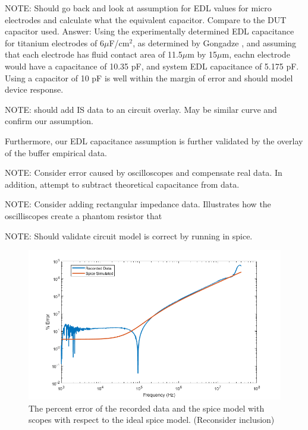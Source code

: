 \par NOTE: Should go back and look at assumption for EDL values for micro electrodes and calculate what the equivalent capacitor. Compare to the DUT capacitor used. Answer: Using the experimentally determined EDL capacitance for titanium electrodes of 6$\mu$F/cm$^2$, as determined by Gongadze \cite{_gongadze.pdf_????}, and assuming that each electrode has fluid contact area of 11.5$\mu$m by 15$\mu$m, eachn electrode would have a capacitance of 10.35 pF, and system EDL capacitance of 5.175 pF. Using a capacitor of 10 pF is well within the margin of error and should model device response. 

\par NOTE: should add IS data to an circuit overlay. May be similar curve and confirm our assumption.

\par Furthermore, our EDL capacitance assumption is further validated by the overlay of the buffer empirical data.

\par NOTE: Consider error caused by oscilloscopes and compensate real data. In addition, attempt to subtract theoretical capacitance from data.

\par NOTE: Consider adding rectangular impedance data. Illustrates how the oscilliscopes create a phantom resistor that 

\par NOTE: Should validate circuit model is correct by running in spice.

\begin{figure}[H]
    \centering
    \includegraphics[width=\textwidth]{images/measurementError.png}
    \caption{The percent error of the recorded data and the spice model with scopes with respect to the ideal spice model. (Reconsider inclusion)}
    \label{fig:test_circ_measurement_error}
\end{figure}
